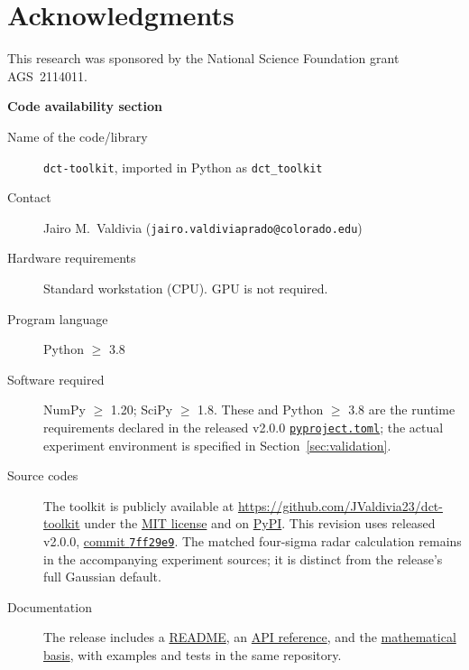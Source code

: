 \documentclass[a4paper,fleqn]{cas-sc}
\begin{document}
\section*{Acknowledgments}

This research was sponsored by the National Science Foundation grant AGS~2114011.

\noindent\textbf{Code availability section}

\begin{description}
\item[Name of the code/library] \texttt{dct-toolkit}, imported in Python as \texttt{dct\_toolkit}
\item[Contact] Jairo M.~Valdivia (\texttt{jairo.valdiviaprado@colorado.edu})
\item[Hardware requirements] Standard workstation (CPU). GPU is not required.
\item[Program language] Python $\ge$ 3.8
\item[Software required] NumPy $\ge$ 1.20; SciPy $\ge$ 1.8. These and Python $\ge$ 3.8 are the runtime requirements declared in the released v2.0.0 \href{https://github.com/JValdivia23/dct-toolkit/blob/7ff29e998dd1102d3fef2a84050402e86dc7ef67/pyproject.toml}{\texttt{pyproject.toml}}; the actual experiment environment is specified in Section~\ref{sec:validation}.
\item[Source codes] The toolkit is publicly available at \url{https://github.com/JValdivia23/dct-toolkit} under the \href{https://github.com/JValdivia23/dct-toolkit/blob/7ff29e998dd1102d3fef2a84050402e86dc7ef67/LICENSE}{MIT license} and on \href{https://pypi.org/project/dct-toolkit/2.0.0/}{PyPI}. This revision uses released v2.0.0, \href{https://github.com/JValdivia23/dct-toolkit/commit/7ff29e998dd1102d3fef2a84050402e86dc7ef67}{commit \texttt{7ff29e9}}. The matched four-sigma radar calculation remains in the accompanying experiment sources; it is distinct from the release's full Gaussian default.
\item[Documentation] The release includes a \href{https://github.com/JValdivia23/dct-toolkit/blob/7ff29e998dd1102d3fef2a84050402e86dc7ef67/README.md}{README}, an \href{https://github.com/JValdivia23/dct-toolkit/blob/7ff29e998dd1102d3fef2a84050402e86dc7ef67/docs/API_REFERENCE.md}{API reference}, and the \href{https://github.com/JValdivia23/dct-toolkit/blob/7ff29e998dd1102d3fef2a84050402e86dc7ef67/docs/MATHEMATICAL_BASIS.md}{mathematical basis}, with examples and tests in the same repository.
\end{description}
\end{document}
